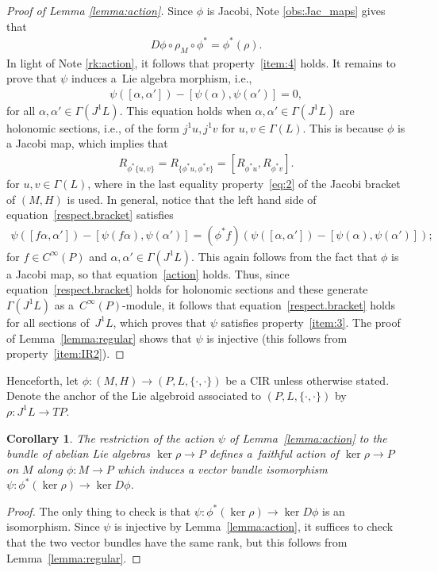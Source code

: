 \documentclass[pdftex]{sigma}
\numberwithin{equation}{section}
\newtheorem{Corollary}[Theorem]{Corollary}
\newcommand{\JM}{(P,L,\{\cdot,\cdot\})} %
\newcommand{\CM}{(M,H)} %
\begin{document}
\begin{proof}[Proof of Lemma \ref{lemma:action}] Since $\phi$ is Jacobi, Note \ref{obs:Jac_maps} gives that
 \begin{gather}\label{action}
 D\phi\circ\rho_M\circ\phi^*=\phi^*(\rho).
 \end{gather}
 In light of Note \ref{rk:action}, it follows that property~\ref{item:4} holds. It remains to prove that $\psi$ induces a~Lie
 algebra morphism, i.e.,
 \begin{gather}\label{respect.bracket}
 \psi([\alpha,\alpha'])-[\psi(\alpha),\psi(\alpha')]=0,
 \end{gather}
for all $\alpha,\alpha' \in \Gamma(J^1L)$. This equation holds when $\alpha,\alpha'\in\Gamma(J^1L)$ are holonomic sections, i.e., of the form $j^1u,j^1v$ for $u,v \in \Gamma(L)$. This is because $\phi$ is a Jacobi map, which implies that
 \begin{gather*}%
 R_{\phi^*\{u,v\}}=R_{\{\phi^*u,\phi^*v\}}=[R_{\phi^*u},R_{\phi^*v}].
 \end{gather*}
for $u,v\in \Gamma(L)$, where in the last equality property~\eqref{eq:2} of the Jacobi bracket of $\CM$ is used. In general, notice that the left hand side of equation~\eqref{respect.bracket} satisf\/ies
 \begin{gather*}
 \psi([f\alpha,\alpha'])-[\psi(f\alpha),\psi(\alpha')] = (\phi^*f)(\psi([\alpha,\alpha'])-[\psi(\alpha),\psi(\alpha')]);
 \end{gather*}
for $f \in C^{\infty}(P)$ and $\alpha,\alpha' \in \Gamma(J^1L)$. This again follows from the fact that $\phi$ is a Jacobi map, so that equation~\eqref{action} holds. Thus, since equation~\eqref{respect.bracket} holds for holonomic sections and these generate $\Gamma(J^1L)$ as a~$C^{\infty}(P)$-module, it follows that equation~\eqref{respect.bracket} holds for all sections of~$J^1L$, which proves that $\psi$ satisf\/ies property~\ref{item:3}. The proof of Lemma~\ref{lemma:regular} shows that $\psi$ is injective (this follows from property~\ref{item:IR2}).
\end{proof}

Henceforth, let $\phi \colon \CM \to \JM$ be a CIR unless otherwise stated. Denote the anchor of the Lie algebroid associated to $\JM$ by $\rho \colon J^1 L \to TP$.

\begin{Corollary}\label{obs:trans_inf_action}
The restriction of the action $\psi$ of Lemma~{\rm \ref{lemma:action}} to the bundle of abelian Lie algebras $\ker\rho \to P$ defines a~faithful action of $\ker \rho \to P$ on $M$ along $\phi \colon M \to P$ which induces a vector bundle isomorphism $\psi \colon \phi^*(\ker \rho) \to \ker D\phi$.
\end{Corollary}
\begin{proof} The only thing to check is that $\psi \colon \phi^*(\ker \rho) \to \ker D\phi$ is an isomorphism. Since $\psi$ is injective by Lemma~\ref{lemma:action}, it suf\/f\/ices to check that the two vector bundles have the same rank, but this follows from Lemma~\ref{lemma:regular}.
\end{proof}
\end{document}
